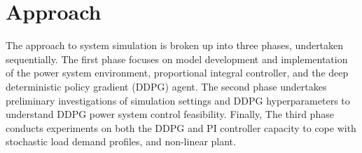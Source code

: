 \chapter{Approach}
The approach to system simulation is broken up into three phases, undertaken sequentially. The first phase focuses on model development and implementation of the power system environment, proportional integral controller, and the deep deterministic policy gradient (DDPG) agent. The second phase undertakes preliminary investigations of simulation settings and DDPG hyperparameters to understand DDPG power system control feasibility. Finally, The third phase conducts experiments on both the DDPG and PI controller capacity to cope with stochastic load demand profiles, and non-linear plant.






